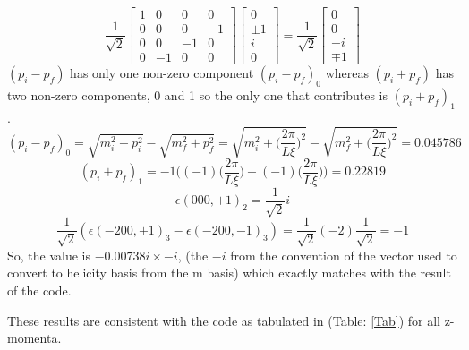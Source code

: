 \documentclass[10pt]{article}
\begin{document}
\begin{enumerate}
\[ 
\frac{1}{\sqrt{2}}
\begin{bmatrix} 
1&0&0&0\\
0&0 & 0 & -1\\
0&0 & -1 & 0\\
0&-1 & 0 & 0
\end{bmatrix} 
\begin{bmatrix}
0\\
\pm1\\
i\\
0
\end{bmatrix} 
= \frac{1}{\sqrt{2}}
\begin{bmatrix}
0\\
0\\
-i\\
\mp 1
\end{bmatrix} 
\]
$(p_i - p_f)$ has only one non-zero component $(p_i - p_f)_0$ whereas $(p_i + p_f)$ has two non-zero components, 0 and 1 so the only one that contributes is $(p_i + p_f)_1$. 
\begin{equation}
(p_i - p_f)_0 = \sqrt{m_i^2 + p_i^2} - \sqrt{m_f^2 + p_f^2} = \sqrt{m_i^2 + \Bigg(\frac{2\pi}{L\xi}\Bigg)^2} - \sqrt{m_f^2 + \Bigg( \frac{2\pi}{L\xi}\Bigg)^2} = 0.045786 
\end{equation}
\begin{equation}
(p_i + p_f)_1 = -1 \Bigg(  (-1) \Bigg(\frac{2\pi}{L\xi}\Bigg) + (-1) \Bigg( \frac{2\pi}{L\xi} \Bigg ) \Bigg) = 0.22819
\end{equation}
\begin{equation}
\epsilon(000, +1)_2 = \frac{1}{\sqrt{2}}i
\end{equation}
\begin{equation}
\frac{1}{\sqrt{2}}(\epsilon(-200, +1)_ 3 - \epsilon(-200, -1)_ 3)= \frac{1}{\sqrt{2}}(-2) \frac{1}{\sqrt{2}} = -1
\end{equation}
So, the value is $-0.00738i \times -i$, (the $-i$ from the convention of the vector used to convert to helicity basis from the m basis) which exactly matches with the result of the code.
\end{enumerate}
These results are {\color{red}consistent} with the code as tabulated in (Table: \ref{Tab}) for all z-momenta.
\end{document}
